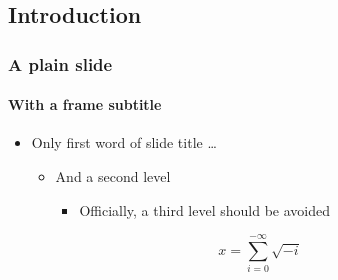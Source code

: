 \documentclass[aspectratio=169,colour]{tuos-presentation}
\begin{document}
\subsection{Introduction}

\begin{frame}[plain]
  \frametitle{A plain slide}
  \framesubtitle{With a frame subtitle}
  \begin{itemize}
  \item Only first word of slide title \ldots
    \begin{itemize}
    \item  And a second level 
      \begin{itemize}
      \item  Officially, a third level should be avoided
      \end{itemize}
    \end{itemize}
  \end{itemize}
  \[ x = \sum_{i=0}^{-\infty}\sqrt{-i}\]
\end{frame}




\ThanksFrame

\CopyrightFrame
\end{document}
